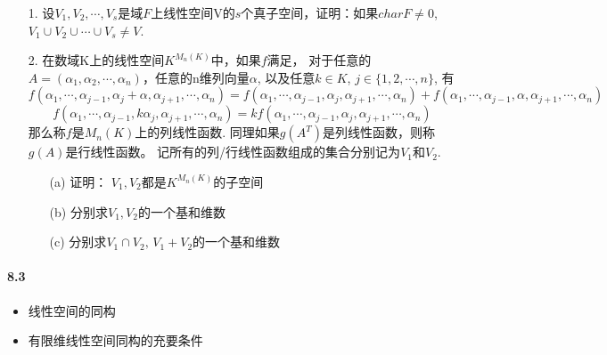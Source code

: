 \begin{itemize}
  \item[1.] 设$V_1, V_2, \cdots, V_s$是域$F$上线性空间V的$s$个真子空间，证明：如果$char F \ne 0$,
  $V_1\cup V_2\cup \cdots \cup V_s \ne V$.
  \vspace{2cm}

  \item[2.] 在数域K上的线性空间$K^{M_n(K)}$中，如果$f$满足，
  对于任意的$A=(\alpha_1, \alpha_2,\cdots, \alpha_n)$，任意的n维列向量$\alpha$, 以及任意$k\in K$, $j\in \{1,2,\cdots, n\}$,
  有 
  $$f(\alpha_1, \cdots, \alpha_{j-1}, \alpha_{j} + \alpha, \alpha_{j+1}, \cdots, \alpha_n)
  = f(\alpha_1, \cdots, \alpha_{j-1}, \alpha_{j}, \alpha_{j+1}, \cdots, \alpha_n) + 
    f(\alpha_1, \cdots, \alpha_{j-1}, \alpha, \alpha_{j+1}, \cdots, \alpha_n)$$
  $$f(\alpha_1, \cdots, \alpha_{j-1}, k\alpha_{j}, \alpha_{j+1}, \cdots, \alpha_n)
  = kf(\alpha_1, \cdots, \alpha_{j-1}, \alpha_{j}, \alpha_{j+1}, \cdots, \alpha_n)
  $$
  那么称$f$是$M_n(K)$上的列线性函数. 同理如果$g(A^T)$是列线性函数，则称$g(A)$是行线性函数。
  记所有的列/行线性函数组成的集合分别记为$V_1$和$V_2$.
  \begin{itemize} 
    \item[(a)] 证明： $V_1, V_2$都是$K^{M_n(K)}$的子空间
    \item[(b)] 分别求$V_1, V_2$的一个基和维数
    \item[(c)] 分别求$V_1 \cap V_2,\,V_1 + V_2$的一个基和维数 
  \end{itemize}
\end{itemize}
\vspace{6cm}

\paragraph{8.3}
\begin{itemize}
    \item 线性空间的同构
    \item 有限维线性空间同构的充要条件
\end{itemize}

